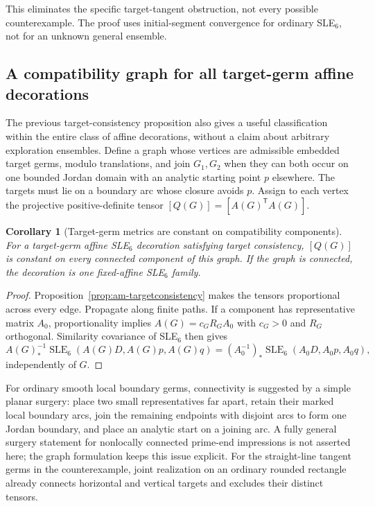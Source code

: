 \documentclass[11pt]{article}
\newtheorem{corollary}[theorem]{Corollary}
\theoremstyle{definition}\newtheorem{definition}[theorem]{Definition}
\theoremstyle{remark}\newtheorem{remark}[theorem]{Remark}
\begin{document}
This eliminates the specific target-tangent obstruction, not every
possible counterexample. The proof uses initial-segment convergence for
ordinary SLE$_6$, not for an unknown general ensemble.

\subsection{A compatibility graph for all target-germ affine decorations}

The previous target-consistency proposition also gives a useful classification
within the entire class of affine decorations, without a claim about arbitrary
exploration ensembles. Define a graph whose vertices are admissible embedded
target germs, modulo translations, and join $G_1,G_2$ when they can both occur
on one bounded Jordan domain with an analytic starting point $p$ elsewhere.
The targets must lie on a boundary arc whose closure avoids $p$.
Assign to each vertex the projective positive-definite tensor
$[Q(G)]=[A(G)^{\mathsf T}A(G)]$.

\begin{corollary}[Target-germ metrics are constant on compatibility components]
\label{cor:am-germgraph}
For a target-germ affine SLE$_6$ decoration satisfying target consistency,
$[Q(G)]$ is constant on every connected component of this graph.
If the graph is connected, the decoration is one fixed-affine SLE$_6$ family.
\end{corollary}
\begin{proof}
Proposition~\ref{prop:am-targetconsistency} makes the tensors proportional
across every edge. Propagate along finite paths.
If a component has representative matrix $A_0$, proportionality implies
$A(G)=c_G R_G A_0$ with $c_G>0$ and $R_G$ orthogonal.
Similarity covariance of SLE$_6$ then gives
\[
 A(G)^{-1}_*\operatorname{SLE}_6(A(G)D,A(G)p,A(G)q)
 = (A_0^{-1})_*\operatorname{SLE}_6(A_0D,A_0p,A_0q),
\]
independently of $G$.
\end{proof}

For ordinary smooth local boundary germs, connectivity is suggested by a
simple planar surgery: place two small representatives far apart, retain
their marked local boundary arcs, join the remaining endpoints with disjoint
arcs to form one Jordan boundary, and place an analytic start on a joining
arc. A fully general surgery statement for nonlocally connected prime-end
impressions is not asserted here; the graph formulation keeps this issue
explicit. For the straight-line tangent germs in the counterexample, joint
realization on an ordinary rounded rectangle already connects horizontal
and vertical targets and excludes their distinct tensors.
\end{document}
